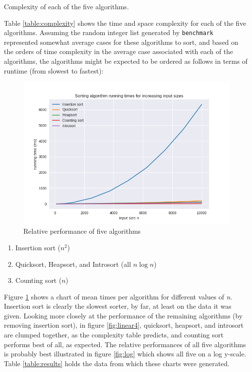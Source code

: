 \documentclass[12pt, a4paper]{article}
\begin{document}
\begin{table}[H]
    \resizebox{\textwidth}{!}{%
    
    }
\caption{Complexity of each of the five algorithms.}
\label{table:complexity}
\end{table}


Table \ref{table:complexity} shows the time and space complexity for each of the five algorithms. Assuming the random integer list generated by \texttt{benchmark} represented somewhat average cases for these algorithms to sort, and based on the orders of time complexity in the average case associated with each of the algorithms, the algorithms might be expected to be ordered as follows in terms of runtime (from slowest to fastest):

\begin{figure}
    \includegraphics[width=\linewidth]{bm_output/plot_0_linear_20210513-101604.png}
    \caption{Relative performance of five algorithms}
    \label{fig:linear5}
\end{figure}

\begin{enumerate}
    \itemsep0em 
    \item Insertion sort ($n^{2}$)
    \item Quicksort, Heapsort, and Introsort (all $n\log n$)
    \item Counting sort ($n$)
\end{enumerate}

Figure \ref{fig:linear5} shows a chart of mean times per algorithm for different values of \emph{n}. Insertion sort is clearly the slowest sorter, by far, at least on the data it was given. Looking more closely at the performance of the remaining algorithms (by removing insertion sort), in figure \ref{fig:linear4}, quicksort, heapsort, and introsort are clumped together, as the complexity table predicts, and counting sort performs best of all, as expected. The relative performances of all five algorithms is probably best illustrated in figure \ref{fig:log} which shows all five on a log y-scale. Table \ref{table:results} holds the data from which these charts were generated.
\end{document}
